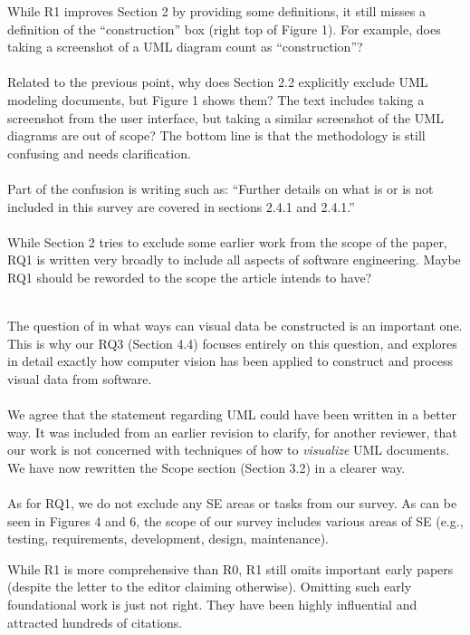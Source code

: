 \documentclass[12pt]{article}
\newcommand\response[1]{\textcolor{responseColor}{\\#1\\}}
\begin{document}
While R1 improves Section 2 by providing some 
definitions, 
it still misses a definition of 
the ``construction'' box (right top of Figure 1). 
For example, does taking a screenshot of a UML 
diagram count as ``construction''?
\\ \\
Related to the previous point, why does Section 2.2 
explicitly exclude UML modeling documents, 
but Figure 1 shows them? The text includes 
taking a screenshot from the user interface, 
but taking a similar screenshot of the 
UML diagrams are out of scope? The bottom line is 
that the methodology is still confusing and needs 
clarification.
\\ \\
Part of the confusion is writing such as:
``Further details on what is or is not 
included in this survey are covered in sections 2.4.1 
and 2.4.1.''
\\ \\
While Section 2 tries to exclude some earlier work 
from the scope of the paper, RQ1 is written very broadly 
to include all aspects of software engineering. 
Maybe RQ1 should be reworded to the scope the article 
intends to have?

\response{
The question of in what ways can visual data be 
constructed is an important one. 
This is why our RQ3 (Section 4.4) focuses entirely on 
this question, 
and explores in detail exactly how computer vision 
has been applied to construct and process 
visual data from software. 
\\ \\
We agree that 
the statement regarding UML could have 
been written in a better way.
It was included from an earlier revision
to clarify, for another reviewer, 
that our work is not concerned with 
techniques of how to \emph{visualize} UML documents. 
We have now rewritten the Scope section (Section 3.2)
in a clearer way.
\\ \\ 
As for RQ1, we do not exclude any SE areas or tasks from 
our survey. 
As can be seen in Figures 4 and 6, the scope of our 
survey includes various areas of SE 
(e.g., testing, requirements, development, design, 
maintenance). 
}



While R1 is more comprehensive than R0, 
R1 still omits important early papers 
(despite the letter to the editor claiming otherwise). 
Omitting such early foundational work 
is just not right. They have been 
highly influential and 
attracted hundreds of citations. 
\end{document}
